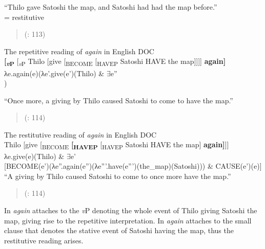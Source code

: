\documentclass[output=paper,modfonts,nonflat,
 hidelinks
]{langsci/langscibook}
\begin{document}
\ex “Thilo gave Satoshi the map, and Satoshi had had the map   before.”\\
= {restitutive}
\z
\z

\begin{quote}
(\citealt{BeckJohnson2004}: 113)
\end{quote}

 \ea\label{ex:bondarenko:}
{The repetitive reading of \textit{again} in English DOC}\\

\ea \textbf{[\textit{\textsubscript{v}}}\textbf{\textsubscript{P}}\textsubscript{}  [\textit{\textsubscript{v}}\textsubscript{P} Thilo [give [\textsubscript{BECOME} [\textsubscript{HAVEP} Satoshi HAVE the map]]]] \textbf{again]}\\
\ex λe.again(e)(λe'.give(e')(Thilo) \& ${\exists}$e''\\
)

\ex     “Once more, a giving by Thilo caused Satoshi to come to have   the map.”
\z
\z

\begin{quote}
(\citealt{BeckJonshon2004}: 114)
\end{quote}

 \ea\label{ex:bondarenko:}
{The restitutive reading of \textit{again} in English DOC}\\

\ea Thilo [give [\textsubscript{BECOME} \textbf{[\textsubscript{HAVEP}} [\textsubscript{HAVEP} Satoshi HAVE the map] \textbf{again]}]]\\
\ex λe.give(e)(Thilo) \& ${\exists}$e'\\{}
     [BECOME(e')(λe''.again(e'')(λe'''.have(e''')(the\_map)(Satoshi))) \& CAUSE(e')(e)]\\
\ex     “A giving by Thilo caused Satoshi to come to once more have the   map.”
\z
\z

\begin{quote}
(\citealt{BeckJonshon2004}: 114)
\end{quote}


In  \textit{again} attaches to the \textit{v}P denoting the whole event of Thilo giving Satoshi the map, giving rise to the repetitive interpretation. In  \textit{again} attaches to the small clause that denotes the stative event of Satoshi having the map, thus the restitutive reading arises.
\end{document}
